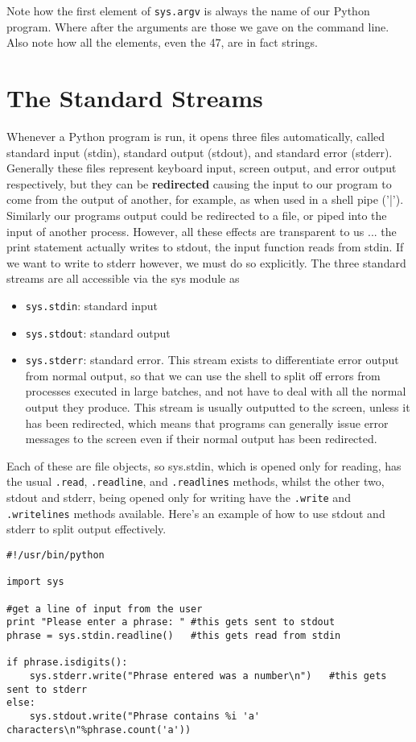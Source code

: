 Note how the first element of 
\texttt{sys.argv} is always the   name of our Python program. Where after the arguments are those we gave   on the command line. Also note how all the elements, even the 47, are   in fact strings.

\section{The Standard Streams}

Whenever a Python program is run, it opens three files   automatically, called standard input (stdin), standard output (stdout),   and standard error (stderr). Generally these files represent keyboard   input, screen output, and error output respectively, but they can be   \textbf{redirected} causing the input to our program to come   from the output of another, for example, as when used in a shell pipe   ('|'). Similarly our programs output could be redirected to a file, or   piped into the input of another process. However, all these effects are   transparent to us ... the print statement actually writes to stdout,   the input function reads from stdin. If we want to write to stderr   however, we must do so explicitly. The three standard streams are all   accessible via the sys module as
\begin{itemize}
	\item 
\texttt{sys.stdin}: standard input
	\item 
\texttt{sys.stdout}: standard output
	\item 
\texttt{sys.stderr}: standard error. This stream exists to    differentiate error output from normal output, so that we can use    the shell to split off errors from processes executed in large    batches, and not have to deal with all the normal output they    produce. This stream is usually outputted to the screen, unless it    has been redirected, which means that programs can generally issue    error messages to the screen even if their normal output has been    redirected.
\end{itemize}

Each of these are file objects, so sys.stdin, which is opened only   for reading, has the usual 
\texttt{.read}, 
\texttt{.readline},   and 
\texttt{.readlines} methods, whilst the other two, stdout and   stderr, being opened only for writing have the 
\texttt{.write} and   
\texttt{.writelines} methods available. Here's an example of how to   use stdout and stderr to split output effectively.
\begin{lstlisting}
#!/usr/bin/python

import sys

#get a line of input from the user
print "Please enter a phrase: "	#this gets sent to stdout
phrase = sys.stdin.readline()	#this gets read from stdin

if phrase.isdigits():
    sys.stderr.write("Phrase entered was a number\n")	#this gets sent to stderr
else:
    sys.stdout.write("Phrase contains %i 'a' characters\n"%phrase.count('a'))
\end{lstlisting}


